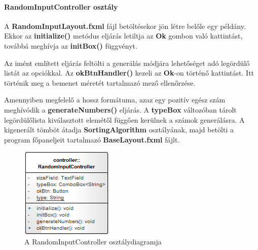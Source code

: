 \documentclass{elteikthesis}
\begin{document}
\paragraph{RandomInputController osztály}
A \textbf{RandomInputLayout.fxml} fájl betöltésekor jön létre belőle egy példány. Ekkor az \textbf{initialize()} metódus eljárás letiltja az \textbf{Ok} gombon való kattintást, továbbá meghívja az \textbf{initBox()} függvényt.\par
Az imént említett eljárás feltölti a generálás módjára lehetőséget adó legördülő listát az opciókkal. Az \textbf{okBtnHandler()} kezeli az \textbf{Ok}-on történő kattintást. Itt történik meg a bemenet méretét tartalmazó mező ellenőrzése.\par Amennyiben megfelelő a hossz formátuma, azaz egy pozitív egész szám meghívódik a \textbf{generateNumbers()} eljárás. A \textbf{typeBox} változóban tárolt legördülőlista kiválasztott elemétől függően kerülnek a számok generálásra. A kigenerált tömböt átadja \textbf{SortingAlgorithm} osztályának, majd betölti a program főpaneljeit tartalmazó \textbf{BaseLayout.fxml} fájlt.
\begin{figure}[H]
	\centering
	\includegraphics{pics/class/RandomInputController.png}
	\caption{A RandomInputController osztálydiagramja}
\end{figure}\par
\end{document}
